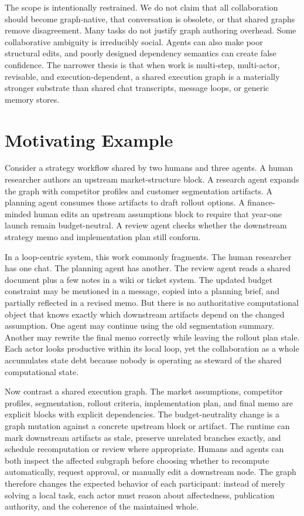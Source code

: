 \documentclass{article}
\begin{document}
The scope is intentionally restrained. We do not claim that all collaboration should become graph-native, that conversation is obsolete, or that shared graphs remove disagreement. Many tasks do not justify graph authoring overhead. Some collaborative ambiguity is irreducibly social. Agents can also make poor structural edits, and poorly designed dependency semantics can create false confidence. The narrower thesis is that when work is multi-step, multi-actor, revisable, and execution-dependent, a shared execution graph is a materially stronger substrate than shared chat transcripts, message loops, or generic memory stores.

\section{Motivating Example}

Consider a strategy workflow shared by two humans and three agents. A human researcher authors an upstream market-structure block. A research agent expands the graph with competitor profiles and customer segmentation artifacts. A planning agent consumes those artifacts to draft rollout options. A finance-minded human edits an upstream assumptions block to require that year-one launch remain budget-neutral. A review agent checks whether the downstream strategy memo and implementation plan still conform.

In a loop-centric system, this work commonly fragments. The human researcher has one chat. The planning agent has another. The review agent reads a shared document plus a few notes in a wiki or ticket system. The updated budget constraint may be mentioned in a message, copied into a planning brief, and partially reflected in a revised memo. But there is no authoritative computational object that knows exactly which downstream artifacts depend on the changed assumption. One agent may continue using the old segmentation summary. Another may rewrite the final memo correctly while leaving the rollout plan stale. Each actor looks productive within its local loop, yet the collaboration as a whole accumulates state debt because nobody is operating as steward of the shared computational state.

Now contrast a shared execution graph. The market assumptions, competitor profiles, segmentation, rollout criteria, implementation plan, and final memo are explicit blocks with explicit dependencies. The budget-neutrality change is a graph mutation against a concrete upstream block or artifact. The runtime can mark downstream artifacts as stale, preserve unrelated branches exactly, and schedule recomputation or review where appropriate. Humans and agents can both inspect the affected subgraph before choosing whether to recompute automatically, request approval, or manually edit a downstream node. The graph therefore changes the expected behavior of each participant: instead of merely solving a local task, each actor must reason about affectedness, publication authority, and the coherence of the maintained whole.
\end{document}
